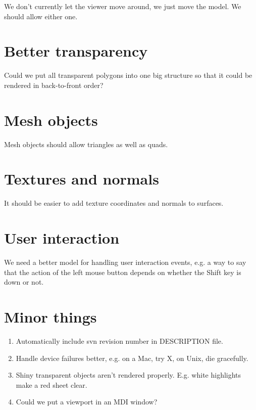 \documentclass[12pt]{article}
\begin{document}
We don't currently let the viewer move around, we just move the model.  We should allow either
one.

\section{Better transparency}

Could we put all transparent polygons into one big structure so that it could be rendered in back-to-front
order?

\section{Mesh objects}

Mesh objects should allow triangles as well as quads.

\section{Textures and normals }

It should be easier to add texture coordinates and normals to surfaces.

\section{User interaction}

We need a better model for handling user interaction events, e.g. a way to say that the
action of the left mouse button depends on whether the Shift key is down or not.

\section{Minor things}

\begin{enumerate}
\item Automatically include svn revision number in DESCRIPTION file.
\item Handle device failures better, e.g. on a Mac, try X, on Unix, die gracefully.
\item Shiny transparent objects aren't rendered properly.  E.g. white highlights make
a red sheet clear.  
\item Could we put a viewport in an MDI window?

\end{enumerate}
\end{document}
